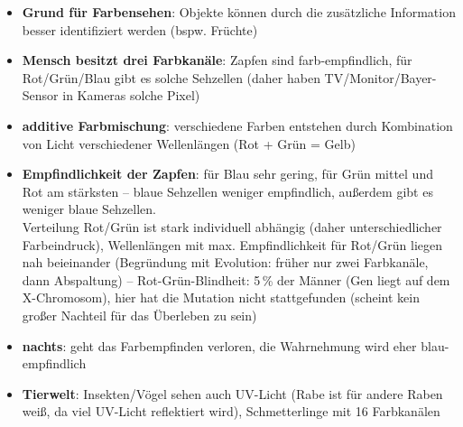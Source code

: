 \begin{itemize}
    \item
    \textbf{Grund für Farbensehen}:
    Objekte können durch die zusätzliche Information besser identifiziert
    werden (bspw. Früchte)
    
    \item
    \textbf{Mensch besitzt drei Farbkanäle}:
    Zapfen sind farb-empfindlich, für Rot/Grün/Blau gibt es solche Sehzellen
    (daher haben TV/Monitor/Bayer-Sensor in Kameras solche Pixel)
    
    \item
    \textbf{additive Farbmischung}:
    verschiedene Farben entstehen durch Kombination von Licht verschiedener
    Wellenlängen (Rot + Grün = Gelb)
    
    \item
    \textbf{Empfindlichkeit der Zapfen}:
    für Blau sehr gering, für Grün mittel und Rot am stärksten --
    blaue Sehzellen weniger empfindlich, außerdem gibt es weniger blaue
    Sehzellen. \\
    Verteilung Rot/Grün ist stark individuell abhängig
    (daher unterschiedlicher Farbeindruck),
    Wellenlängen mit max. Empfindlichkeit für Rot/Grün liegen nah beieinander
    (Begründung mit Evolution: früher nur zwei Farbkanäle, dann Abspaltung) --
    Rot-Grün-Blindheit: 5\,\% der Männer (Gen liegt auf dem X-Chromosom),
    hier hat die Mutation nicht stattgefunden
    (scheint kein großer Nachteil für das Überleben zu sein)
    
    \item
    \textbf{nachts}:
    geht das Farbempfinden verloren, die Wahrnehmung wird eher blau-empfindlich
    
    \item
    \textbf{Tierwelt}:
    Insekten/Vögel sehen auch UV-Licht
    (Rabe ist für andere Raben weiß, da viel UV-Licht reflektiert wird),
    Schmetterlinge mit 16 Farbkanälen
\end{itemize}
\linie
\pagebreak
